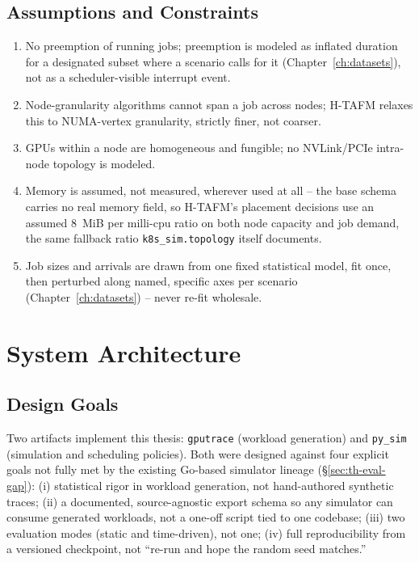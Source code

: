 \documentclass[12pt]{report}
\begin{document}
\section{Assumptions and Constraints}
\begin{enumerate}[leftmargin=1.4em]
  \item No preemption of running jobs; preemption is modeled as inflated
    duration for a designated subset where a scenario calls for it
    (Chapter~\ref{ch:datasets}), not as a scheduler-visible interrupt event.
  \item Node-granularity algorithms cannot span a job across nodes;
    H-TAFM relaxes this to NUMA-vertex granularity, strictly finer, not
    coarser.
  \item GPUs within a node are homogeneous and fungible; no NVLink/PCIe
    intra-node topology is modeled.
  \item \label{sec:th-mem-assumption} Memory is assumed, not measured,
    wherever used at all -- the base schema carries no real memory field,
    so H-TAFM's placement decisions use an assumed $8$~MiB per milli-cpu
    ratio on both node capacity and job demand, the same fallback ratio
    \texttt{k8s\_sim.topology} itself documents.
  \item Job sizes and arrivals are drawn from one fixed statistical
    model, fit once, then perturbed along named, specific axes per
    scenario (Chapter~\ref{ch:datasets}) -- never re-fit wholesale.
\end{enumerate}

\chapter{System Architecture}
\label{ch:architecture}

\section{Design Goals}
Two artifacts implement this thesis: \texttt{gputrace} (workload
generation) and \texttt{py\_sim} (simulation and scheduling policies).
Both were designed against four explicit goals not fully met by the
existing Go-based simulator lineage (\S\ref{sec:th-eval-gap}):
(i) statistical rigor in workload generation, not hand-authored synthetic
traces; (ii) a documented, source-agnostic export schema so any simulator
can consume generated workloads, not a one-off script tied to one
codebase; (iii) two evaluation modes (static and time-driven), not one;
(iv) full reproducibility from a versioned checkpoint, not ``re-run and
hope the random seed matches.''
\end{document}
